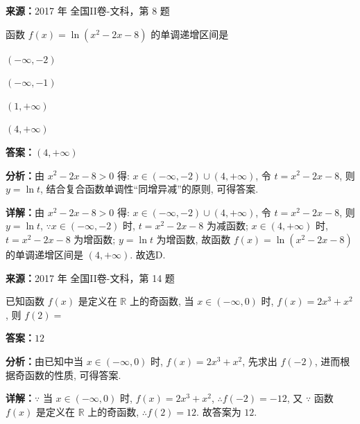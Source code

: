 \begin{question}[points=5]
\textbf{来源：}2017 年 全国II卷-文科，第 8 题\par
函数 $f(x)=\ln(x^2-2x-8)$ 的单调递增区间是
\begin{choices}
  \item $(-\infty,-2)$
  \item $(-\infty,-1)$
  \item $(1,+\infty)$
  \item $(4,+\infty)$
\end{choices}
\begin{solution}
\textbf{答案：}$(4,+\infty)$

\textbf{分析：}由 $x^2-2x-8>0$ 得: $x\in(-\infty,-2)\cup(4,+\infty)$, 令 $t=x^2-2x-8$, 则 $y=\ln t$, 结合复合函数单调性“同增异减”的原则, 可得答案.

\textbf{详解：}由 $x^2-2x-8>0$ 得: $x\in(-\infty,-2)\cup(4,+\infty)$, 令 $t=x^2-2x-8$, 则 $y=\ln t$, $\because x\in(-\infty,-2)$ 时, $t=x^2-2x-8$ 为减函数; $x\in(4,+\infty)$ 时, $t=x^2-2x-8$ 为增函数; $y=\ln t$ 为增函数, 故函数 $f(x)=\ln(x^2-2x-8)$ 的单调递增区间是 $(4,+\infty)$. 故选D.
\end{solution}
\end{question}

\begin{question}[points=5]
\textbf{来源：}2017 年 全国II卷-文科，第 14 题\par
已知函数 $f(x)$ 是定义在 $\mathbb{R}$ 上的奇函数, 当 $x\in(-\infty,0)$ 时, $f(x)=2x^3+x^2$, 则 $f(2)=$
\fillin[{$12$}]
\begin{solution}
\textbf{答案：}$12$

\textbf{分析：}由已知中当 $x\in(-\infty,0)$ 时, $f(x)=2x^3+x^2$, 先求出 $f(-2)$, 进而根据奇函数的性质, 可得答案.

\textbf{详解：}$\because$ 当 $x\in(-\infty,0)$ 时, $f(x)=2x^3+x^2$, $\therefore f(-2)=-12$, 又 $\because$ 函数 $f(x)$ 是定义在 $\mathbb{R}$ 上的奇函数, $\therefore f(2)=12$. 故答案为 $12$.
\end{solution}
\end{question}

